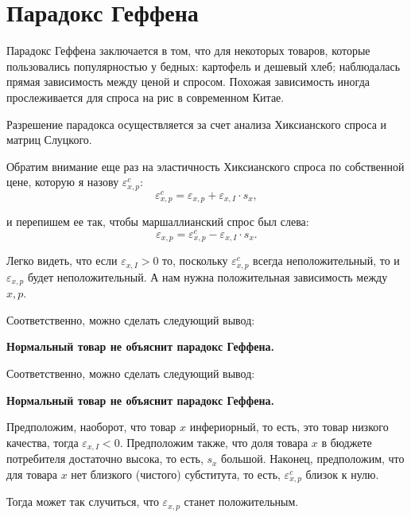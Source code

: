 \documentclass{beamer}
\begin{document}
\section{Парадокс Геффена}

\begin{frame}

Парадокс Геффена заключается в том, что для некоторых товаров, которые пользовались популярностью у бедных: картофель и дешевый хлеб; наблюдалась прямая зависимость между ценой и спросом. Похожая зависимость иногда прослеживается для спроса на рис в современном Китае.

Разрешение парадокса осуществляется за счет анализа Хиксианского спроса и матриц Слуцкого. 

\end{frame}

\begin{frame}

Обратим внимание еще раз на эластичность Хиксианского спроса по собственной цене, которую я назову $\varepsilon^c_{x,p}$:
$$\varepsilon^c_{x,p} = \varepsilon_{x,p} + \varepsilon_{x,I} \cdot s_{x},$$

и перепишем ее так, чтобы маршаллианский спрос был слева:
$$\varepsilon_{x,p} = \varepsilon^c_{x,p} - \varepsilon_{x,I} \cdot s_{x}.$$

Легко видеть, что если $\varepsilon_{x,I} > 0$ то, поскольку $\varepsilon^c_{x,p}$ всегда неположительный, то и $\varepsilon_{x,p}$ будет неположительный. А нам нужна положительная зависимость между $x,p$. 
\end{frame}

\begin{frame}

Соответственно, можно сделать следующий вывод:

\textbf{Нормальный товар не объяснит парадокс Геффена.}

\end{frame}

\begin{frame}

Соответственно, можно сделать следующий вывод:

\textbf{Нормальный товар не объяснит парадокс Геффена.}

\end{frame}

\begin{frame}
Предположим, наоборот, что товар $x$ инфериорный, то есть, это товар низкого качества, тогда $\varepsilon_{x,I} < 0$. Предположим также, что доля товара $x$ в бюджете потребителя достаточно высока, то есть, $s_{x}$ большой. Наконец, предположим, что для товара $x$ нет близкого (чистого) субститута, то есть, $\varepsilon^c_{x,p}$ близок к нулю.

Тогда может так случиться, что $\varepsilon_{x,p}$ станет положительным.

\end{frame}
\end{document}
